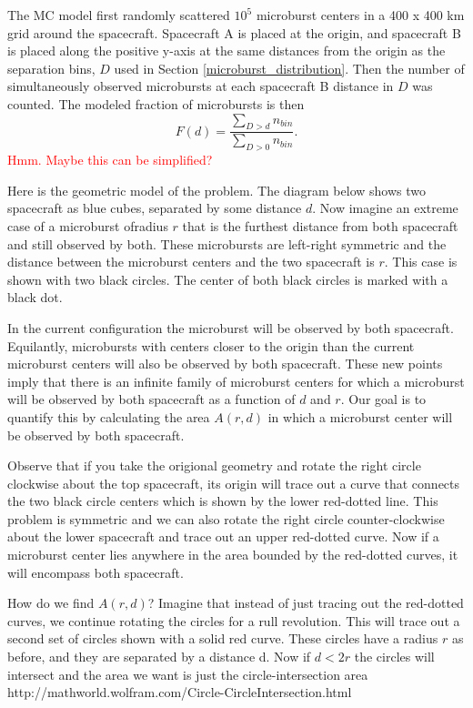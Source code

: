 \documentclass[draft]{agujournal2019}
\begin{document}
The MC model first randomly scattered $10^5$ microburst centers in a 400 x 400 km grid around the spacecraft. Spacecraft A is placed at the origin, and spacecraft B is placed along the positive y-axis at the same distances from the origin as the separation bins, $D$ used in Section \ref{microburst_distribution}. Then the number of simultaneously observed microbursts at each spacecraft B distance in $D$ was counted. The modeled fraction of microbursts is then
\begin{equation}
F(d) = \frac{\sum_{D > d} n_{bin} }{\sum_{D > 0} n_{bin}}.
\end{equation}\textcolor{red}{Hmm. Maybe this can be simplified?}

Here is the geometric model of the problem. The diagram below shows two spacecraft as blue cubes, separated by some distance $d$. Now imagine an extreme case of a microburst ofradius $r$ that is the furthest distance from both spacecraft and still observed by both. These microbursts are left-right symmetric and the distance between the microburst centers and the two spacecraft is $r$. This case is shown with two black circles. The center of both black circles is marked with a black dot.

In the current configuration the microburst will be observed by both spacecraft. Equilantly, microbursts with centers closer to the origin than the current microburst centers will also be observed by both spacecraft. These new points imply that there is an infinite family of microburst centers for which a microburst will be observed by both spacecraft as a function of $d$ and $r$. Our goal is to quantify this by calculating the area $A(r, d)$ in which a microburst center will be observed by both spacecraft.

Observe that if you take the origional geometry and rotate the right circle clockwise about the top spacecraft, its origin will trace out a curve that connects the two black circle centers which is shown by the lower red-dotted line. This problem is symmetric and we can also rotate the right circle counter-clockwise about the lower spacecraft and trace out an upper red-dotted curve. Now if a microburst center lies anywhere in the area bounded by the red-dotted curves, it will encompass both spacecraft.

How do we find $A(r, d)$? Imagine that instead of just tracing out the red-dotted curves, we continue rotating the circles for a rull revolution. This will trace out a second set of circles shown with a solid red curve. These circles have a radius $r$ as before, and they are separated by a distance d. Now if $d < 2r$ the circles will intersect and the area we want is just the circle-intersection area http://mathworld.wolfram.com/Circle-CircleIntersection.html
\end{document}
